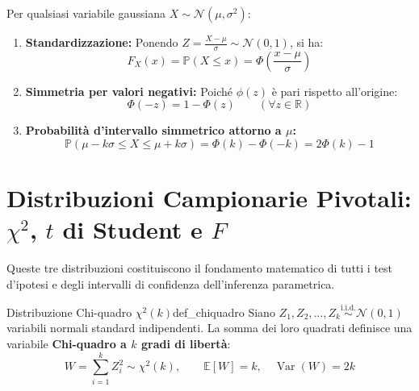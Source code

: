 \begin{metodo}
Per qualsiasi variabile gaussiana $X \sim \mathcal{N}(\mu, \sigma^2)$:
\begin{enumerate}
    \item \textbf{Standardizzazione:} Ponendo $Z = \frac{X - \mu}{\sigma} \sim \mathcal{N}(0, 1)$, si ha:
    \begin{equation}
        F_X(x) = \mathbb{P}(X \le x) = \Phi\left(\frac{x - \mu}{\sigma}\right)
    \end{equation}
    \item \textbf{Simmetria per valori negativi:} Poiché $\phi(z)$ è pari rispetto all'origine:
    \begin{equation}
        \Phi(-z) = 1 - \Phi(z) \qquad (\forall z \in \mathbb{R})
    \end{equation}
    \item \textbf{Probabilità d'intervallo simmetrico attorno a $\mu$:}
    \begin{equation}
        \mathbb{P}(\mu - k\sigma \le X \le \mu + k\sigma) = \Phi(k) - \Phi(-k) = 2\Phi(k) - 1
    \end{equation}
\end{enumerate}
\end{metodo}

\section{Distribuzioni Campionarie Pivotali: $\chi^2$, $t$ di Student e $F$}
\label{sec:distribuzioni_pivotali}

Queste tre distribuzioni costituiscono il fondamento matematico di tutti i test d'ipotesi e degli intervalli di confidenza dell'inferenza parametrica.

\begin{definizione}{Distribuzione Chi-quadro $\chi^2(k)$}{def_chiquadro}
Siano $Z_1, Z_2, \dots, Z_k \stackrel{\text{i.i.d.}}{\sim} \mathcal{N}(0, 1)$ variabili normali standard indipendenti. La somma dei loro quadrati definisce una variabile \textbf{Chi-quadro a $k$ gradi di libertà}:
\begin{equation}
    W = \sum_{i=1}^k Z_i^2 \sim \chi^2(k), \qquad \mathbb{E}[W] = k, \quad \operatorname{Var}(W) = 2k
\end{equation}
\end{definizione}

